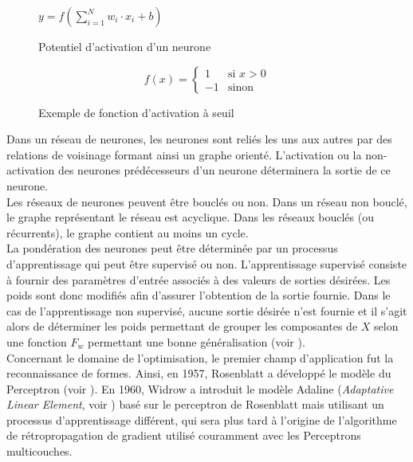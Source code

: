 \begin{figure}[h]
  \centering
  $y=f(\sum \limits^{N}_{i=1} w_i\cdot x_i + b)$
  \caption{Potentiel d'activation d'un neurone}
  \label{fig:tsp:nn:potentiel}
\end{figure}

\begin{figure}[h]
  \begin{equation*}
  f(x)= \begin{cases}
        1 & \text{si } x>0\\
        -1 & \text{sinon}
       \end{cases}
  \end{equation*}
  \caption{Exemple de fonction d'activation à seuil}
  \label{fig:tsp:nn:fonctionSeuil}
\end{figure}

Dans un réseau de neurones, les neurones sont reliés les uns aux autres par des relations de voisinage formant ainsi un graphe orienté. L'activation ou la non-activation des neurones prédécesseurs d'un neurone déterminera la sortie de ce neurone.\\

Les réseaux de neurones peuvent être bouclés ou non. Dans un réseau non bouclé, le graphe représentant le réseau est acyclique. Dans les réseaux bouclés (ou récurrents), le graphe contient au moins un cycle.\\

La pondération des neurones peut être déterminée par un processus d'apprentissage qui peut être supervisé ou non. L'apprentissage supervisé consiste à fournir des paramètres d'entrée associés à des valeurs de sorties désirées. Les poids sont donc modifiés afin d'assurer l'obtention de la sortie fournie. Dans le cas de l'apprentissage non supervisé, aucune sortie désirée n'est fournie et il s'agit alors de déterminer les poids permettant de grouper les composantes de $X$ selon une fonction $F_w$ permettant une bonne généralisation (voir \cite{Kohonen1982}).\\

Concernant le domaine de l'optimisation, le premier champ d'application fut la reconnaissance de formes. Ainsi, en 1957, Rosenblatt a développé le modèle du Perceptron (voir \cite{Rosenblatt1958}). En 1960, Widrow a introduit le modèle Adaline (\textit{Adaptative Linear Element}, voir \cite{Widrow1960}) basé sur le perceptron de Rosenblatt mais utilisant un processus d'apprentissage différent, qui sera plus tard à l'origine de l'algorithme de rétropropagation de gradient utilisé couramment avec les Perceptrons multicouches.

